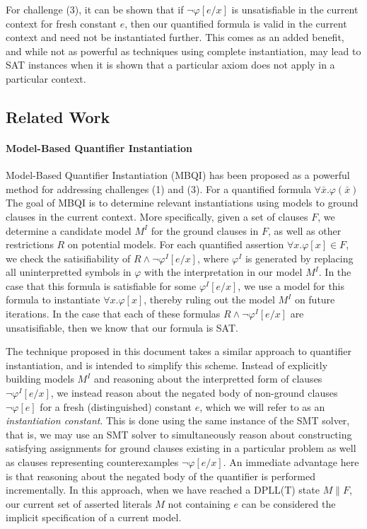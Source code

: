 \documentclass{llncs}
\begin{document}
For challenge (3), it can be shown that if $\neg \varphi[e/x]$ is unsatisfiable in the current context for fresh constant $e$, then our quantified formula is valid in the current context and need not be instantiated further.
This comes as an added benefit, and while not as powerful as techniques using complete instantiation, may lead to SAT instances when it is shown that a particular axiom does not apply in a particular context.

\subsection{Related Work}

\paragraph{Model-Based Quantifier Instantiation}
Model-Based Quantifier Instantiation (MBQI) has been proposed as a powerful method for addressing challenges (1) and (3).
For a quantified formula $\forall \bar{x}. \varphi(\bar{x})$
The goal of MBQI is to determine relevant instantiations using models to ground clauses in the current context.
More specifically, given a set of clauses $F$, we determine a candidate model $M^I$ for the ground clauses in $F$, as well as other restrictions $R$ on potential models.
For each quantified assertion $\forall x. \varphi[x] \in F$, we check the satisifiability of $R \wedge \neg \varphi^I[e/x]$, where $\varphi^I$ is generated by replacing all uninterpretted symbols in $\varphi$ with the interpretation in our model $M^I$.
In the case that this formula is satisfiable for some $\varphi^I[e/x]$, we use a model for this formula to instantiate $\forall x. \varphi[x]$, thereby ruling out the model $M^I$ on future iterations.
In the case that each of these formulas $R \wedge \neg \varphi^I[e/x]$ are unsatisifiable, then we know that our formula is SAT.


The technique proposed in this document takes a similar approach to quantifier instantiation, and is intended to simplify this scheme.
Instead of explicitly building models $M^I$ and reasoning about the interpretted form of clauses $\neg \varphi^I[e/x]$, we instead reason  about the negated body of non-ground clauses $\neg \varphi[e]$ for a fresh (distinguished) constant $e$, which we will refer to as an \emph{instantiation constant}.
This is done using the same instance of the SMT solver, that is, we may use an SMT solver to simultaneously reason about constructing satisfying assignments for ground clauses existing in a particular problem as well as clauses representing counterexamples $\neg \varphi[e/x]$.
An immediate advantage here is that reasoning about the negated body of the quantifier is performed incrementally.
In this approach, when we have reached a DPLL(T) state $M \parallel F$, our current set of asserted literals $M$ not containing $e$ can be considered the implicit specification of a current model.
\end{document}

